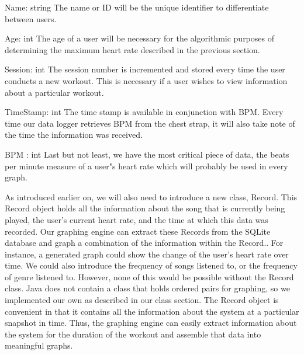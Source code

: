 \documentclass[letterpaper,english, 12pt]{scrreprt}
\begin{document}
Name: string \textendash The name or ID will be the unique identifier to differentiate between users. \newline

Age: int \textendash The age of a user will be necessary for the algorithmic purposes of determining the maximum heart rate described in the previous section. \newline

Session: int \textendash The session number is incremented and stored every time the user conducts a new workout. This is necessary if a user wishes to view information about a particular workout. \newline

TimeStamp: int \textendash The time stamp is available in conjunction with BPM. Every time our data logger retrieves BPM from the chest strap, it will also take note of the time the information was received. \newline

BPM : int \textendash Last but not least, we have the most critical piece of data, the beats per minute measure of a user"s heart rate which will probably be used in every graph. \newline

As introduced earlier on, we will also need to introduce a new class, Record. This Record object holds all the information about the song that is currently being played, the user's current heart rate, and the time at which this data was recorded. Our graphing engine can extract these Records from the SQLite database and graph a combination of the information within the Record.. For instance, a generated graph could show the change of the user's heart rate over time. We could also introduce the frequency of songs listened to, or the frequency of genre listened to. However, none of this would be possible without the Record class. Java does not contain a class that holds ordered pairs for graphing, so we implemented our own as described in our class section. The Record object is convenient in that it contains all the information about the system at a particular snapshot in time. Thus, the graphing engine can easily extract information about the system for the duration of the workout and assemble that data into meaningful graphs. \newline
\end{document}
